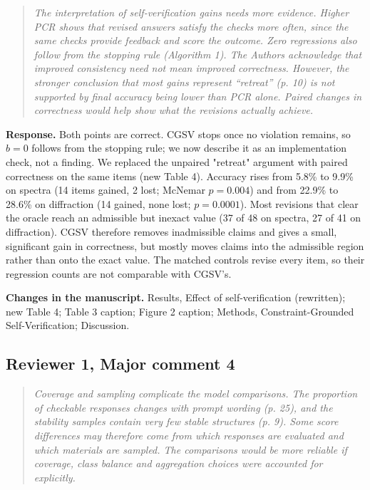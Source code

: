 \documentclass[11pt,a4paper]{article}
\newenvironment{reviewer}{\begin{quote}\itshape\small}{\end{quote}}
\begin{document}
\begin{reviewer}The interpretation of self-verification gains needs more evidence. Higher PCR shows that revised answers satisfy the checks more often, since the same checks provide feedback and score the outcome. Zero regressions also follow from the stopping rule (Algorithm 1). The Authors acknowledge that improved consistency need not mean improved correctness. However, the stronger conclusion that most gains represent “retreat” (p. 10) is not supported by final accuracy being lower than PCR alone. Paired changes in correctness would help show what the revisions actually achieve.\end{reviewer}

\textbf{Response.} Both points are correct. CGSV stops once no violation remains, so $b=0$ follows from the stopping rule; we now describe it as an implementation check, not a finding. We replaced the unpaired "retreat" argument with paired correctness on the same items (new Table 4). Accuracy rises from 5.8\% to 9.9\% on spectra (14 items gained, 2 lost; McNemar $p=0.004$) and from 22.9\% to 28.6\% on diffraction (14 gained, none lost; $p=0.0001$). Most revisions that clear the oracle reach an admissible but inexact value (37 of 48 on spectra, 27 of 41 on diffraction). CGSV therefore removes inadmissible claims and gives a small, significant gain in correctness, but mostly moves claims into the admissible region rather than onto the exact value. The matched controls revise every item, so their regression counts are not comparable with CGSV's.

\textbf{Changes in the manuscript.} Results, Effect of self-verification (rewritten); new Table 4; Table 3 caption; Figure 2 caption; Methods, Constraint-Grounded Self-Verification; Discussion.

\subsection*{Reviewer 1, Major comment 4}

\begin{reviewer}Coverage and sampling complicate the model comparisons. The proportion of checkable responses changes with prompt wording (p. 25), and the stability samples contain very few stable structures (p. 9). Some score differences may therefore come from which responses are evaluated and which materials are sampled. The comparisons would be more reliable if coverage, class balance and aggregation choices were accounted for explicitly.\end{reviewer}
\end{document}
